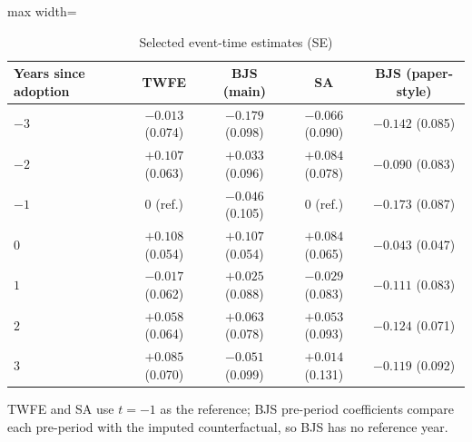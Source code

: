\documentclass[11pt]{article}
\begin{document}
\begin{table}[H]\centering\small
\caption{Selected event-time estimates (SE)}
\begin{adjustbox}{max width=\linewidth}
\begin{tabular}{lcccc}
\toprule
Years since adoption & TWFE & BJS (main) & SA & BJS (paper-style)\\
\midrule
$-3$ & $-0.013$ (0.074) & $-0.179$ (0.098) & $-0.066$ (0.090) & $-0.142$ (0.085)\\
$-2$ & $+0.107$ (0.063) & $+0.033$ (0.096) & $+0.084$ (0.078) & $-0.090$ (0.083)\\
$-1$ & 0 (ref.) & $-0.046$ (0.105) & 0 (ref.) & $-0.173$ (0.087)\\
$0$ & $+0.108$ (0.054) & $+0.107$ (0.054) & $+0.084$ (0.065) & $-0.043$ (0.047)\\
$1$ & $-0.017$ (0.062) & $+0.025$ (0.088) & $-0.029$ (0.083) & $-0.111$ (0.083)\\
$2$ & $+0.058$ (0.064) & $+0.063$ (0.078) & $+0.053$ (0.093) & $-0.124$ (0.071)\\
$3$ & $+0.085$ (0.070) & $-0.051$ (0.099) & $+0.014$ (0.131) & $-0.119$ (0.092)\\
\bottomrule
\end{tabular}
\end{adjustbox}
\par\smallskip\footnotesize TWFE and SA use $t=-1$ as the reference; BJS pre-period coefficients compare each pre-period with the imputed counterfactual, so BJS has no reference year.
\end{table}

\end{document}

